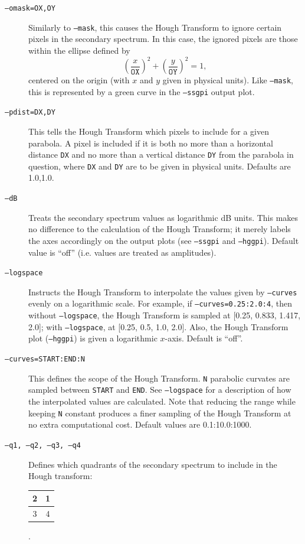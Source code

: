 \documentclass{article}
\begin{document}
\begin{description}
    \item[\texttt{--omask=OX,OY}] Similarly to \texttt{--mask}, this causes the Hough Transform to ignore certain pixels in the secondary spectrum. In this case, the ignored pixels are those within the ellipse defined by
        \[ \left(\frac{x}{\texttt{OX}}\right)^2 + \left(\frac{y}{\texttt{OY}}\right)^2= 1, \]
        centered on the origin (with $x$ and $y$ given in physical units). Like \texttt{--mask}, this is represented by a green curve in the \texttt{--ssgpi} output plot.
    \item[\texttt{--pdist=DX,DY}] This tells the Hough Transform which pixels to include for a given parabola. A pixel is included if it is both no more than a horizontal distance \texttt{DX} and no more than a vertical distance \texttt{DY} from the parabola in question, where \texttt{DX} and \texttt{DY} are to be given in physical units. Defaults are 1.0,1.0.
    \item[\texttt{--dB}] Treats the secondary spectrum values as logarithmic dB units. This makes no difference to the calculation of the Hough Transform; it merely labels the axes accordingly on the output plots (see \texttt{--ssgpi} and \texttt{--hggpi}). Default value is ``off'' (i.e. values are treated as amplitudes).
    \item[\texttt{--logspace}] Instructs the Hough Transform to interpolate the values given by \texttt{--curves} evenly on a logarithmic scale. For example, if \texttt{--curves=0.25:2.0:4}, then without \texttt{--logspace}, the Hough Transform is sampled at [0.25, 0.833, 1.417, 2.0]; with \texttt{--logspace}, at [0.25, 0.5, 1.0, 2.0]. Also, the Hough Transform plot (\texttt{--hggpi}) is given a logarithmic $x$-axis. Default is ``off''.
    \item[\texttt{--curves=START:END:N}] This defines the scope of the Hough Transform. \texttt{N} parabolic curvates are sampled between \texttt{START} and \texttt{END}. See \texttt{--logspace} for a description of how the interpolated values are calculated. Note that reducing the range while keeping \texttt{N} constant produces a finer sampling of the Hough Transform at no extra computational cost. Default values are 0.1:10.0:1000.
    \item[\texttt{--q1, --q2, --q3, --q4}] Defines which quadrants of the secondary spectrum to include in the Hough transform:
        \begin{tabular}{c|c}
            2 & 1 \\
            \hline
            3 & 4
        \end{tabular}.

\end{description}
\end{document}
